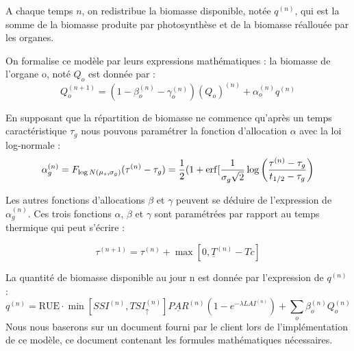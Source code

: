 A chaque temps $n$, on redistribue la biomasse disponible, notée $q^{(n)}$, qui est la somme de la biomasse produite par photosynthèse et de la biomasse réallouée par les organes.

On formalise ce modèle par leurs expressions mathématiques : 
la biomasse de l'organe o, noté $Q_o$ est donnée par :
\[ {Q_o^{(n+1)}} = (1-\beta_o^{(n)}-\gamma_o^{(n)} )(Q_o)^{(n)} +\alpha_o^{(n)}q^{(n)} \]

En supposant que la répartition de biomasse ne commence qu'après un temps caractéristique $\tau_g$ nous pouvons paramétrer la fonction d'allocation $\alpha$ avec la loi log-normale :
\[ {\alpha_g^{(n)}}=F_{\log N(\mu_s,\sigma_g)}(\tau^{(n)}-\tau_g)=\frac{1}{2} (1+\operatorname{erf}[\frac{1}{\sigma_g \sqrt{2}}\log\left(\frac{\tau^{(n)}-\tau_g}{t_{1/2}-\tau_g}\right) \]

Les autres fonctions d'allocations $\beta$ et $\gamma$   peuvent se déduire de l'expression de $\alpha_g^{(n)}$.
Ces trois fonctions $\alpha$, $\beta$ et $\gamma$ sont paramétrées par rapport au temps thermique qui peut s'écrire :

\[ {\tau}^{(n+1)}=\tau^{(n)}+\max[0,\underline{T}^{(n)}-Tc] \]

La quantité de biomasse disponible au jour n est donnée par l'expression de $q^{(n)}$ :
\[ 
{q^{(n)}} = \text{RUE}\cdot \min[SSI^{(n)}, TSI_\uparrow^{(n)}]\underline{PAR}^{(n)}(1-e^{-\lambda LAI^{(n)}})+\sum_o \beta_o^{(n)}Q_o^{(n)} 
\]
Nous nous baserons sur un document fourni par le client lors de l'implémentation de ce modèle, ce document contenant les formules mathématiques nécessaires.


